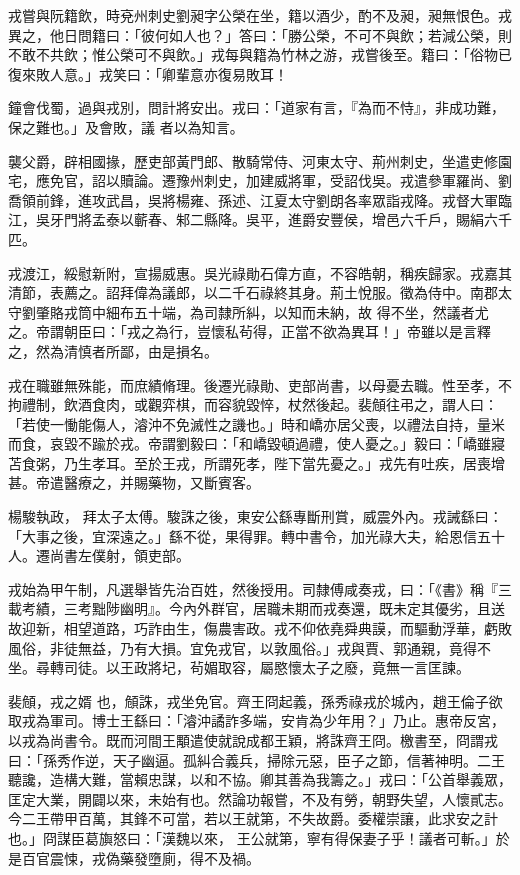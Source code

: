 \begin{pinyinscope}
 戎嘗與阮籍飲，時兗州刺史劉昶字公榮在坐，籍以酒少，酌不及昶，昶無恨色。戎異之，他日問籍曰：「彼何如人也？」答曰：「勝公榮，不可不與飲；若減公榮，則不敢不共飲；惟公榮可不與飲。」戎每與籍為竹林之游，戎嘗後至。籍曰：「俗物已復來敗人意。」戎笑曰：「卿輩意亦復易敗耳！



 鐘會伐蜀，過與戎別，問計將安出。戎曰：「道家有言，『為而不恃』，非成功難，保之難也。」及會敗，議
 者以為知言。



 襲父爵，辟相國掾，歷吏部黃門郎、散騎常侍、河東太守、荊州刺史，坐遣吏修園宅，應免官，詔以贖論。遷豫州刺史，加建威將軍，受詔伐吳。戎遣參軍羅尚、劉喬領前鋒，進攻武昌，吳將楊雍、孫述、江夏太守劉朗各率眾詣戎降。戎督大軍臨江，吳牙門將孟泰以蘄春、邾二縣降。吳平，進爵安豐侯，增邑六千戶，賜絹六千匹。



 戎渡江，綏慰新附，宣揚威惠。吳光祿勛石偉方直，不容皓朝，稱疾歸家。戎嘉其清節，表薦之。詔拜偉為議郎，以二千石祿終其身。荊土悅服。徵為侍中。南郡太守劉肇賂戎筒中細布五十端，為司隸所糾，以知而未納，故
 得不坐，然議者尤之。帝謂朝臣曰：「戎之為行，豈懷私茍得，正當不欲為異耳！」帝雖以是言釋之，然為清慎者所鄙，由是損名。



 戎在職雖無殊能，而庶績脩理。後遷光祿勛、吏部尚書，以母憂去職。性至孝，不拘禮制，飲酒食肉，或觀弈棋，而容貌毀悴，杖然後起。裴頠往弔之，謂人曰：「若使一慟能傷人，濬沖不免滅性之譏也。」時和嶠亦居父喪，以禮法自持，量米而食，哀毀不踰於戎。帝謂劉毅曰：「和嶠毀頓過禮，使人憂之。」毅曰：「嶠雖寢苫食粥，乃生孝耳。至於王戎，所謂死孝，陛下當先憂之。」戎先有吐疾，居喪增甚。帝遣醫療之，并賜藥物，又斷賓客。



 楊駿執政，
 拜太子太傅。駿誅之後，東安公繇專斷刑賞，威震外內。戎誡繇曰：「大事之後，宜深遠之。」繇不從，果得罪。轉中書令，加光祿大夫，給恩信五十人。遷尚書左僕射，領吏部。



 戎始為甲午制，凡選舉皆先治百姓，然後授用。司隸傅咸奏戎，曰：「《書》稱『三載考績，三考黜陟幽明』。今內外群官，居職未期而戎奏還，既未定其優劣，且送故迎新，相望道路，巧詐由生，傷農害政。戎不仰依堯舜典謨，而驅動浮華，虧敗風俗，非徒無益，乃有大損。宜免戎官，以敦風俗。」戎與賈、郭通親，竟得不坐。尋轉司徒。以王政將圮，茍媚取容，屬愍懷太子之廢，竟無一言匡諫。



 裴頠，戎之婿
 也，頠誅，戎坐免官。齊王冏起義，孫秀祿戎於城內，趙王倫子欲取戎為軍司。博士王繇曰：「濬沖譎詐多端，安肯為少年用？」乃止。惠帝反宮，以戎為尚書令。既而河間王顒遣使就說成都王穎，將誅齊王冏。檄書至，冏謂戎曰：「孫秀作逆，天子幽逼。孤糾合義兵，掃除元惡，臣子之節，信著神明。二王聽讒，造構大難，當賴忠謀，以和不協。卿其善為我籌之。」戎曰：「公首舉義眾，匡定大業，開闢以來，未始有也。然論功報嘗，不及有勞，朝野失望，人懷貳志。今二王帶甲百萬，其鋒不可當，若以王就第，不失故爵。委權崇讓，此求安之計也。」冏謀臣葛旟怒曰：「漢魏以來，
 王公就第，寧有得保妻子乎！議者可斬。」於是百官震悚，戎偽藥發墮廁，得不及禍。




\end{pinyinscope}
